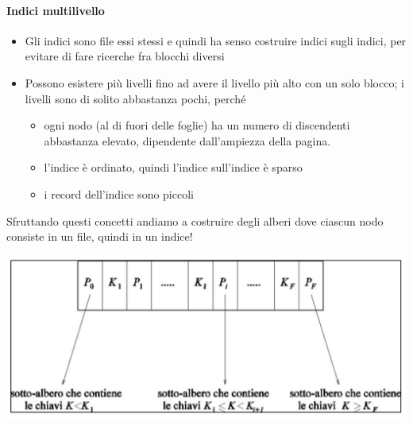 \paragraph{Indici multilivello}
\begin{itemize}
	\item Gli indici sono file essi stessi e quindi ha senso costruire indici sugli indici, per evitare di fare ricerche fra blocchi diversi 
	\item Possono esistere più livelli fino ad avere il livello più alto con un solo blocco; i livelli sono di solito abbastanza pochi, perché
	\begin{itemize}
		\item ogni nodo (al di fuori delle foglie) ha un numero di discendenti abbastanza elevato, dipendente dall'ampiezza della pagina.
		\item l'indice è ordinato, quindi l'indice sull'indice è sparso 
		\item i record dell'indice sono piccoli
	\end{itemize}
\end{itemize}
Sfruttando questi concetti andiamo a costruire degli alberi dove ciascun nodo consiste in un file, quindi in un indice!
\begin{center}\includegraphics{images/229.PNG}\end{center}

